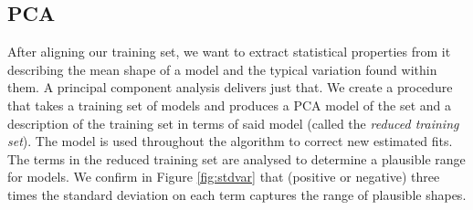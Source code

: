 \documentclass[a4paper,titlepage,12pt]{article}
\begin{document}
\subsection{PCA}
After aligning our training set, we want to extract statistical properties from it describing the mean shape of a model and the typical variation found within them. A principal component analysis delivers just that. We create a procedure that takes a training set of models and produces a PCA model of the set and a description of the training set in terms of said model (called the \emph{reduced training set}). The model is used throughout the algorithm to correct new estimated fits. The terms in the reduced training set are analysed to determine a plausible range for models. We confirm in Figure \ref{fig:stdvar} that (positive or negative) three times the standard deviation on each term captures the range of plausible shapes. 
\end{document}
